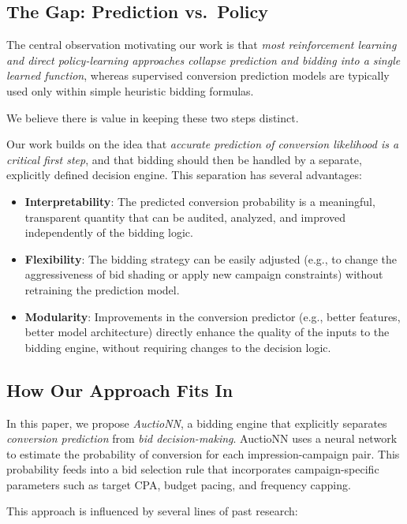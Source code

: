 \documentclass[11pt]{article}
\begin{document}
\subsection{The Gap: Prediction vs.\ Policy}

The central observation motivating our work is that \emph{most reinforcement learning and direct policy-learning approaches collapse prediction and bidding into a single learned function}, whereas supervised conversion prediction models are typically used only within simple heuristic bidding formulas.

We believe there is value in keeping these two steps distinct.

Our work builds on the idea that \emph{accurate prediction of conversion likelihood is a critical first step}, and that bidding should then be handled by a separate, explicitly defined decision engine. This separation has several advantages:

\begin{itemize}
    \item \textbf{Interpretability}: The predicted conversion probability is a meaningful, transparent quantity that can be audited, analyzed, and improved independently of the bidding logic.
    \item \textbf{Flexibility}: The bidding strategy can be easily adjusted (e.g., to change the aggressiveness of bid shading or apply new campaign constraints) without retraining the prediction model.
    \item \textbf{Modularity}: Improvements in the conversion predictor (e.g., better features, better model architecture) directly enhance the quality of the inputs to the bidding engine, without requiring changes to the decision logic.
\end{itemize}

\subsection{How Our Approach Fits In}

In this paper, we propose \emph{AuctioNN}, a bidding engine that explicitly separates \emph{conversion prediction} from \emph{bid decision-making}. AuctioNN uses a neural network to estimate the probability of conversion for each impression-campaign pair. This probability feeds into a bid selection rule that incorporates campaign-specific parameters such as target CPA, budget pacing, and frequency capping.

This approach is influenced by several lines of past research:
\end{document}
